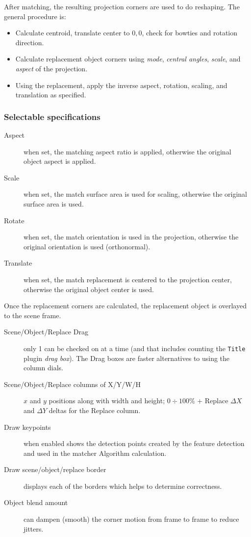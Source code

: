 After matching, the resulting projection corners are used to do reshaping. The general procedure is:

\begin{itemize}[noitemsep]
    \item Calculate centroid, translate center to $0,0$, check for bowties and rotation direction.
    \item Calculate replacement object corners using \textit{mode}, \textit{central angles}, \textit{scale}, and \textit{aspect} of the projection.
    \item Using the replacement, apply the inverse aspect, rotation, scaling, and translation as specified.
\end{itemize}

\subsubsection*{Selectable specifications}%
\label{ssub:selectable_specifications}

\begin{description}
    \item[Aspect] when set, the matching aspect ratio is applied, otherwise the original object aspect is applied.
    \item[Scale] when set, the match surface area is used for scaling, otherwise the original surface area is used.
    \item[Rotate] when set, the match orientation is used in the projection, otherwise the original orientation is used (orthonormal).
    \item[Translate] when set, the match replacement is centered to the projection center, otherwise the original object center is used.
\end{description}

Once the replacement corners are calculated, the replacement object is overlayed to the scene frame.

\begin{description}
    \item[Scene/Object/Replace Drag] only 1 can be checked on at a time (and that includes counting the \texttt{Title}
    plugin \textit{drag box}). The Drag boxes are faster alternatives to using the column dials.
    \item[Scene/Object/Replace columns of X/Y/W/H] $x$ and $y$ positions along with width and height; $0\div100\%$ + Replace $\Delta X$ and $\Delta Y$ deltas for the Replace column.
    \item[Draw keypoints] when enabled shows the detection points created by the feature detection and used in the matcher Algorithm calculation.
    \item[Draw scene/object/replace border] displays each of the borders which helps to determine correctness.
    \item[Object blend amount] can dampen (smooth) the corner motion from frame to frame to reduce jitters.
\end{description}

